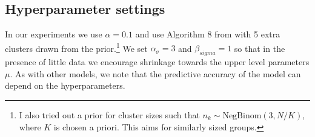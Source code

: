 \subsection{Hyperparameter settings}
In our experiments we use $\alpha=0.1$ and use Algorithm 8 from \cite{Neal2001} with 5 extra clusters drawn from the prior.\footnote{I also tried out a prior for cluster sizes such that $n_k \sim \mbox{NegBinom}(3,N/K)$, where $K$ is chosen a priori.  This aims for similarly sized groups.}
We set $\alpha_{\sigma}=3$ and $\beta_{sigma}=1$ so that in the presence of little data we encourage shrinkage towards the upper level parameters $\mu$.  
As with other models, we note that the predictive accuracy of the model can depend on the hyperparameters.
